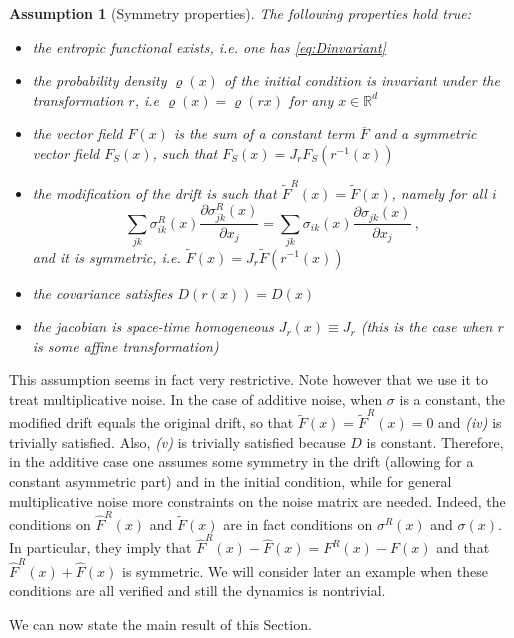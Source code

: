 \documentclass[a4paper,11pt]{article}
\numberwithin{equation}{section}
\newtheorem{assumption}[theorem]{Assumption}
\begin{document}
\begin{assumption}[Symmetry properties]\label{ass:symmetry} The following properties hold true:
\begin{itemize}
    \item[(i)] the entropic functional exists, i.e. one has \eqref{eq:Dinvariant} 
    \item[(ii)] the probability density $\varrho(x)$ of the initial condition is invariant under the transformation $r$, i.e $\varrho(x)=\varrho(rx)$ for any $x \in \mathbb{R}^d$
    \item[(iii)] the vector field $F(x)$ is the sum of a constant term $\overline{F}$ and a symmetric vector field $F_S(x)$, such that $F_S(x)= J_r F_S (r^{-1}(x))$
    \item[(iv)] the modification of the drift is such that $\widetilde{F}^R(x)=\widetilde{F}(x)$, namely for all $i$ 
    $$ \sum_{jk}\sigma^R_{ik}(x)\frac{\partial \sigma^R_{jk}(x)}{\partial x_j} = \sum_{jk}\sigma_{ik}(x)\frac{\partial \sigma_{jk}(x)}{\partial x_j}\,,$$
    and it is symmetric, i.e. $\widetilde{F}(x)= J_r \widetilde{F}(r^{-1}(x))$
    \item[(v)]  the covariance satisfies $D(r(x))= D(x)$
    \item[(vi)] the jacobian is space-time homogeneous $J_r(x) \equiv J_r$ (this is the case when $r$ is some affine transformation)
\end{itemize}
\end{assumption}

This assumption seems in fact very restrictive. Note however that we use it to treat multiplicative noise. In the case of additive noise, when $\sigma$ is a constant, the modified drift equals the original drift, so that $\widetilde{F}(x)=\widetilde{F}^R(x)=0$ and \emph{(iv)} is trivially satisfied. Also, \emph{(v)} is trivially satisfied because $D$ is constant. Therefore, in the additive case one assumes some symmetry in the drift (allowing for a constant asymmetric part) and in the initial condition, while for general multiplicative noise more constraints on the noise matrix are needed. Indeed, the conditions on $\widehat{F}^R(x)$ and $\widetilde{F}(x)$ are in fact conditions on $\sigma^R(x)$ and $\sigma(x)$. In particular, they imply that $\widehat{F}^R(x)-\widehat{F}(x)= F^R(x)-F(x)$ and that $\widehat{F}^R(x)+\widehat{F}(x)$ is symmetric. We will consider later an example when these conditions are all verified and still the dynamics is nontrivial.

We can now state the main result of this Section.
\end{document}
